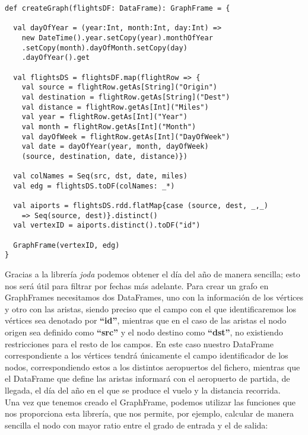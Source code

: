 \begin{lstlisting}[frame=single]
def createGraph(flightsDF: DataFrame): GraphFrame = {

  val dayOfYear = (year:Int, month:Int, day:Int) => 
  	new DateTime().year.setCopy(year).monthOfYear
  	.setCopy(month).dayOfMonth.setCopy(day)
  	.dayOfYear().get
    
  val flightsDS = flightsDF.map(flightRow => {
    val source = flightRow.getAs[String]("Origin")
    val destination = flightRow.getAs[String]("Dest")
    val distance = flightRow.getAs[Int]("Miles")
    val year = flightRow.getAs[Int]("Year")
    val month = flightRow.getAs[Int]("Month")
    val dayOfWeek = flightRow.getAs[Int]("DayOfWeek")
    val date = dayOfYear(year, month, dayOfWeek)
    (source, destination, date, distance)})

  val colNames = Seq(src, dst, date, miles)
  val edg = flightsDS.toDF(colNames: _*)
   
  val aiports = flightsDS.rdd.flatMap{case (source, dest, _,_) 
  	=> Seq(source, dest)}.distinct()
  val vertexID = aiports.distinct().toDF("id")

  GraphFrame(vertexID, edg)
}
\end{lstlisting}

Gracias a la librería \textit{joda} podemos obtener el día del año de manera sencilla; esto nos será útil para filtrar por fechas más adelante. Para crear un grafo en GraphFrames necesitamos dos DataFrames, uno con la información de los vértices y otro con las aristas, siendo preciso que el campo con el que identificaremos los vértices sea denotado por \textbf{“id”}, mientras que en el caso de las aristas el nodo origen sea definido como \textbf{“src”} y el nodo destino como \textbf{“dst”}, no existiendo restricciones para el resto de los campos. En este caso nuestro DataFrame correspondiente a los vértices tendrá únicamente el campo identificador de los nodos, correspondiendo estos a los distintos aeropuertos del fichero, mientras  que el DataFrame que define las aristas informará con el aeropuerto de partida, de llegada, el día del año en el que se produce el vuelo y la distancia recorrida.\\

Una vez que tenemos creado el GraphFrame, podemos utilizar las funciones que nos proporciona esta librería, que nos permite, por ejemplo, calcular de manera sencilla el nodo con mayor ratio entre el grado de entrada y el de salida:\\

